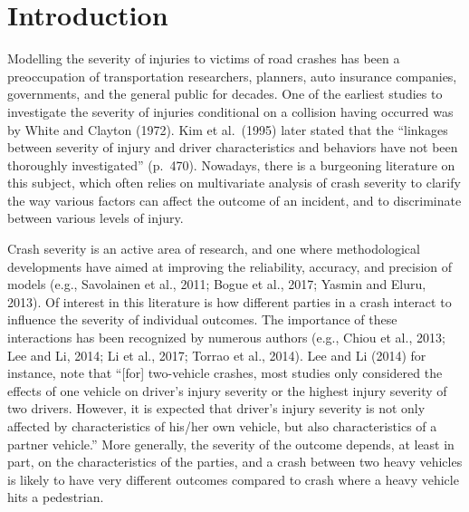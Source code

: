\documentclass[]{elsarticle} %
\begin{document}
\hypertarget{introduction}{%
\section{Introduction}\label{introduction}}

Modelling the severity of injuries to victims of road crashes has been a
preoccupation of transportation researchers, planners, auto insurance
companies, governments, and the general public for decades. One of the
earliest studies to investigate the severity of injuries conditional on
a collision having occurred was by White and Clayton (1972). Kim et
al.~(1995) later stated that the ``linkages between severity of injury
and driver characteristics and behaviors have not been thoroughly
investigated'' (p.~470). Nowadays, there is a burgeoning literature on
this subject, which often relies on multivariate analysis of crash
severity to clarify the way various factors can affect the outcome of an
incident, and to discriminate between various levels of injury.

Crash severity is an active area of research, and one where
methodological developments have aimed at improving the reliability,
accuracy, and precision of models (e.g., Savolainen et al., 2011; Bogue
et al., 2017; Yasmin and Eluru, 2013). Of interest in this literature is
how different parties in a crash interact to influence the severity of
individual outcomes. The importance of these interactions has been
recognized by numerous authors (e.g., Chiou et al., 2013; Lee and Li,
2014; Li et al., 2017; Torrao et al., 2014). Lee and Li (2014) for
instance, note that ``{[}for{]} two-vehicle crashes, most studies only
considered the effects of one vehicle on driver's injury severity or the
highest injury severity of two drivers. However, it is expected that
driver's injury severity is not only affected by characteristics of
his/her own vehicle, but also characteristics of a partner vehicle.''
More generally, the severity of the outcome depends, at least in part,
on the characteristics of the parties, and a crash between two heavy
vehicles is likely to have very different outcomes compared to crash
where a heavy vehicle hits a pedestrian.
\end{document}
